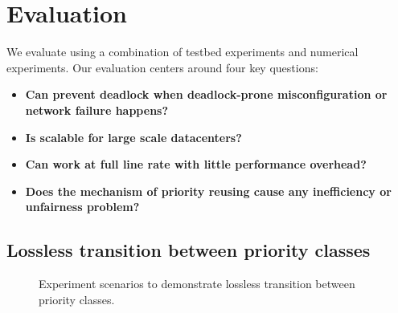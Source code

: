 \section{Evaluation}\label{sec:eval}

We evaluate \sysname{} using a combination of testbed experiments and numerical experiments. Our evaluation centers around four key questions:

\begin{itemize}
	\item \textbf{Can \sysname{} prevent deadlock when deadlock-prone misconfiguration or network failure happens?}
	
	\item \textbf{Is \sysname{} scalable for large scale datacenters?}
	
	\item \textbf{Can \sysname{} work at full line rate with little performance overhead?}
	
	\item \textbf{Does the mechanism of priority reusing cause any inefficiency or unfairness problem?} 
	
\end{itemize}


\subsection{Lossless transition between priority classes}\label{subsec:exp_losslesstransition}

\begin{figure}[t]
	\centering
	
	
	\vspace{-0.15in}

\vspace{-0.15in}
	
	\caption{Experiment scenarios to demonstrate lossless transition between priority classes.}\label{fig:exp_queuetransition}
\end{figure}

